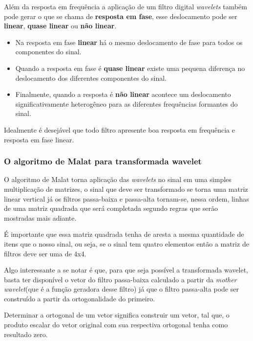 			\par Além da resposta em frequência a aplicação de um filtro digital \textit{wavelets} também pode gerar o que se chama de \textbf{resposta em fase}, esse deslocamento pode ser \textbf{linear}, \textbf{quase linear} ou \textbf{não linear}. 
			
			\begin{itemize}
				\item Na resposta em fase \textbf{linear} há o mesmo deslocamento de fase para todos os componentes do sinal.
				\item Quando a resposta em fase é \textbf{quase linear} existe uma pequena diferença no deslocamento dos diferentes componentes do sinal.
				\item Finalmente, quando a resposta é \textbf{não linear} acontece um deslocamento significativamente heterogêneo para as diferentes frequências formantes do sinal.
				\end{itemize}
			
			\par Idealmente é desejável que todo filtro apresente boa resposta em frequência e resposta em fase linear.
			
		

		\subsubsection{O algoritmo de Malat para transformada wavelet}
			\par O algoritmo de Malat torna aplicação das \textit{wavelets} no sinal em uma simples multiplicação de matrizes, o sinal que deve ser transformado se torna uma matriz linear vertical já os filtros passa-baixa e passa-alta tornam-se, nessa ordem, linhas de uma matriz quadrada que será completada segundo regras que serão mostradas mais adiante.
			\par É importante que essa matriz quadrada tenha de aresta a mesma quantidade de itens que o nosso sinal, ou seja, se o sinal tem quatro elementos então a matriz de filtros deve ser uma de 4x4.
			\par Algo interessante a se notar é que, para que seja possível a transformada wavelet, basta ter disponível o vetor do filtro passa-baixa calculado a partir da \textit{mother wavelet}(que é a função geradora desse filtro) já que o filtro passa-alta pode ser construído a partir da ortogonalidade do primeiro.
			
			\par Determinar a ortogonal de um vetor significa construir um vetor, tal que, o produto escalar do vetor original com sua respectiva ortogonal tenha como resultado zero.
			
